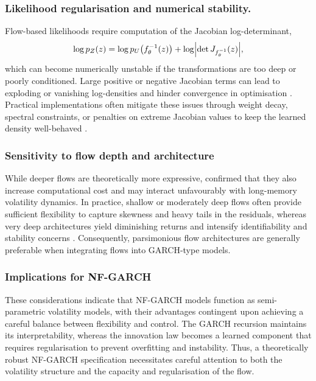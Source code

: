 \documentclass[risks,article,submit,pdftex,moreauthors]{Definitions/mdpi}
\begin{document}
\subsubsection{Likelihood regularisation and numerical stability.}
Flow-based likelihoods require computation of the Jacobian log-determinant,
\[
\log p_Z(z) = \log p_U\big(f^{-1}_\theta(z)\big)
             + \log \Bigl|\det J_{f^{-1}_\theta}(z)\Bigr|,
\]
which can become numerically unstable if the transformations are too deep or poorly conditioned. Large positive or negative Jacobian terms can lead to exploding or vanishing log-densities and hinder convergence in optimisation \citep{papamakarios2021normalizing}. Practical implementations often mitigate these issues through weight decay, spectral constraints, or penalties on extreme Jacobian values to keep the learned density well-behaved \citep{papamakarios2021normalizing}.

\subsubsection{Sensitivity to flow depth and architecture}
While deeper flows are theoretically more expressive, \cite{papamakarios2021normalizing} confirmed that they also increase computational cost and may interact unfavourably with long-memory volatility dynamics. In practice, shallow or moderately deep flows often provide sufficient flexibility to capture skewness and heavy tails in the residuals, whereas very deep architectures yield diminishing returns and intensify identifiability and stability concerns \citep{liu2020flows}. Consequently, parsimonious flow architectures are generally preferable when integrating flows into GARCH-type models.

\subsubsection{Implications for NF-GARCH}
These considerations indicate that NF-GARCH models function as semi-parametric volatility models, with their advantages contingent upon achieving a careful balance between flexibility and control. The GARCH recursion maintains its interpretability, whereas the innovation law becomes a learned component that requires regularisation to prevent overfitting and instability. Thus, a theoretically robust NF-GARCH specification necessitates careful attention to both the volatility structure and the capacity and regularisation of the flow.

\end{document}

